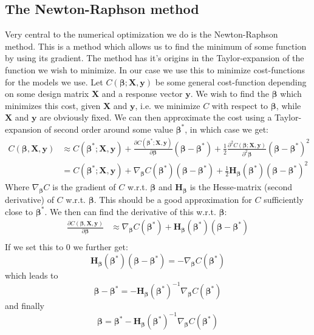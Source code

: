 \documentclass{article}
\begin{document}
\subsection{The Newton-Raphson method}
Very central to the numerical optimization we do is the Newton-Raphson method.
This is a method which allows us to find the minimum of some function by using
its gradient. The method has it's origins in the Taylor-expansion of the
function we wish to minimize. In our case we use this to minimize cost-functions
for the models we use. Let $C(\bm{\beta}; \bm{X}, \bm{y})$ be some general
cost-function depending on some design matrix $\bm{X}$ and a response vector
$\bm{y}$. We wish to find the $\bm{\beta}$ which minimizes this cost, given
$\bm{X}$ and $\bm{y}$, i.e. we minimize $C$ with respect to $\bm{\beta}$, while
$\bm{X}$ and $\bm{y}$ are obviously fixed. We can then approximate the cost using a
Taylor-expansion of second order around some value $\bm{\beta}^*$, in which case
we get:
\begin{align*}
      C(\bm{\beta}, \bm{X}, \bm{y}) & \approx C(\bm{\beta}^*; \bm{X}, \bm{y}) + \frac{\partial C(\bm{\beta}^*; \bm{X}, \bm{y})}{\partial \bm{\beta}}(\bm{\beta} - \bm{\beta}^*) + \frac{1}{2} \frac{\partial^2 C(\bm{\beta}; \bm{X}, \bm{y})}{\partial^2 \bm{\beta}}(\bm{\beta} - \bm{\beta}^*)^2 \\
                                    & = C(\bm{\beta}^*; \bm{X}, \bm{y}) + \nabla_{\bm{\beta}} C(\bm{\beta}^*) (\bm{\beta} - \bm{\beta}^*) + \frac{1}{2} \bm{H}_{\bm{\beta}}(\bm{\beta}^*) (\bm{\beta} - \bm{\beta}^*)^2
\end{align*}
Where $\nabla_{\bm{\beta}} C$ is the gradient of $C$ w.r.t. $\bm{\beta}$ and
$\bm{H}_{\bm{\beta}}$ is the Hesse-matrix (second derivative) of $C$ w.r.t.
$\bm{\beta}$. This should be a good approximation for $C$ sufficiently close to
$\bm{\beta}^*$. We then can find the derivative of this w.r.t. $\bm{\beta}$:
\begin{align*}
      \frac{\partial C(\bm{\beta}, \bm{X}, \bm{y})}{\partial \bm{\beta}} & \approx
      \nabla_{\bm{\beta}} C(\bm{\beta}^*) + \bm{H}_{\bm{\beta}}(\bm{\beta}^*)(\bm{\beta} - \bm{\beta}^*) \\
\end{align*}
If we set this to $0$ we further get:
$$\bm{H}_{\bm{\beta}}(\bm{\beta}^*) (\bm{\beta} - \bm{\beta}^*) = -\nabla_{\bm{\beta}} C(\bm{\beta}^*)$$
which leads to
$$\bm{\beta} - \bm{\beta}^* = - \bm{H}_{\bm{\beta}}(\bm{\beta}^*)^{-1} \nabla_{\bm{\beta}} C(\bm{\beta}^*)$$
and finally
$$\bm{\beta} = \bm{\beta}^* - \bm{H}_{\bm{\beta}}(\bm{\beta}^*)^{-1} \nabla_{\bm{\beta}} C(\bm{\beta}^*)$$
\end{document}
